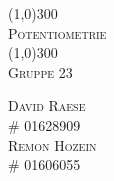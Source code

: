 \begin{titlepage}
  
  \begin{center}
    \line(1,0){300}\\
    [0.25in]
    \textsc{\Huge{Potentiometrie}}\\
    [3mm]
    \line(1,0){300}\\
    [1in]
    \textsc{\Large{Gruppe 23}}\\
    [6.6in]

    \begin{flushright}
      \textsc{David Raese\\
      \# 01628909}\\
      \textsc{Remon Hozein\\
      \# 01606055}
    \end{flushright}
  \end{center}
\end{titlepage}
